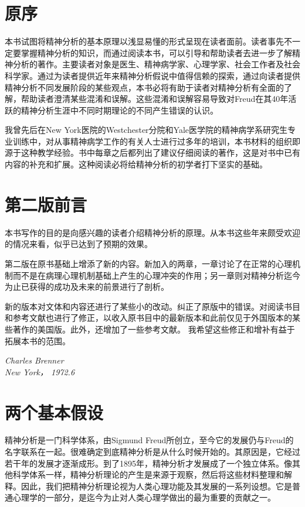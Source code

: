 \documentclass[UTF8,10pt,a4paper,openany]{book}
\newcommand{\signature}[1]{\begin{flushright}\slshape #1\end{flushright}}
\begin{document}
\chapter*{原序}
本书试图将精神分析的基本原理以浅显易懂的形式呈现在读者面前。读者事先不一定要掌握精神分析的知识，而通过阅读本书，可以引导和帮助读者去进一步了解精神分析的著作。主要读者对象是医生、精神病学家、心理学家、社会工作者及社会科学家。通过为读者提供近年来精神分析假说中值得信赖的探索，通过向读者提供精神分析不同发展阶段的某些观点，本书必将有助于读者对精神分析有全面的了解，帮助读者澄清某些混淆和误解。这些混淆和误解容易导致对Freud在其40年活跃的精神分析生涯中不同时期理论的不同产生错误的认识。

我曾先后在New York医院的Westchester分院和Yale医学院的精神病学系研究生专业训练中，对从事精神病学工作的有关人士进行过多年的培训，本书材料的组织即源于这种教学经验。书中每章之后都列出了建议仔细阅读的著作，这是对书中已有内容的补充和扩展。这种阅读必将给精神分析的初学者打下坚实的基础。

\chapter*{第二版前言}
本书写作的目的是向感兴趣的读者介绍精神分析的原理。从本书这些年来颇受欢迎的情况来看，似乎已达到了预期的效果。

第二版在原书基础上增添了新的内容。新加入的两章，一章讨论了在正常的心理机制而不是在病理心理机制基础上产生的心理冲突的作用；另一章则对精神分析迄今为止已获得的成功及未来的前景进行了剖析。

新的版本对文体和内容还进行了某些小的改动。纠正了原版中的错误。对阅读书目和参考文献也进行了修正，以收入原书目中的最新版本和此前仅见于外国版本的某些著作的美国版。此外，还增加了一些参考文献。
我希望这些修正和增补有益于拓展本书的范围。
\signature{Charles Brenner\\ New York， 1972.6}


\tableofcontents

\mainmatter

\chapter{两个基本假设}\label{1}
精神分析是一门科学体系，由Sigmund Freud所创立，至今它的发展仍与Freud的名字联系在一起。很难确定到底精神分析是从什么时候开始的。其原因是，它经过若干年的发展才逐渐成形。到了1895年，精神分析才发展成了一个独立体系。像其他科学体系一样，精神分析理论的产生是来源于观察，然后将这些材料整理和解释。因此，我们把精神分析理论视为人类心理功能及其发展的一系列设想。它是普通心理学的一部分，是迄今为止对人类心理学做出的最为重要的贡献之一。
\end{document}

